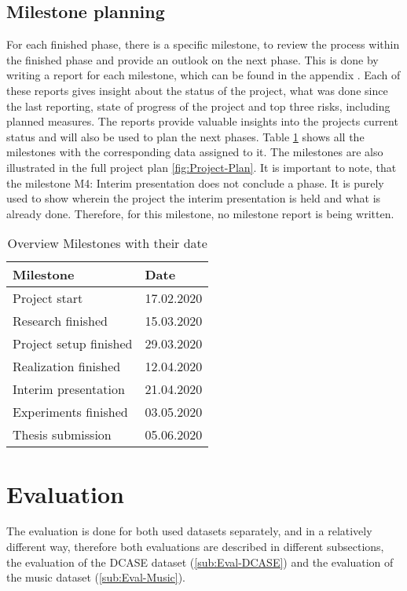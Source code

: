 \subsection{Milestone planning}
\label{sec:Milestone-Planning}
For each finished phase, there is a specific milestone, to review the process within the finished phase and provide an outlook on the next phase. This is done by writing a report for each milestone, which can be found in the appendix . Each of these reports gives insight about the status of the project, what was done since the last reporting, state of progress of the project and top three risks, including planned measures. The reports provide valuable insights into the projects current status and will also be used to plan the next phases. Table \ref{tab:Milestones} shows all the milestones with the corresponding data assigned to it. The milestones are also illustrated in the full project plan \ref{fig:Project-Plan}.
\newline
\newline
It is important to note, that the milestone M4: Interim presentation does not conclude a phase. It is purely used to show wherein the project the interim presentation is held and what is already done. Therefore, for this milestone, no milestone report is being written.

\begin{table}[htbp]
    \centering
    \caption{Overview Milestones with their date}
	\label{tab:Milestones}
    \begin{tabular}{p{} | p{}}
        \toprule
        \textbf{Milestone} & \textbf{Date} \\ 
        \midrule[1pt]
        Project start & 17.02.2020\\
        \hline
        Research finished & 15.03.2020\\
        \hline
        Project setup finished & 29.03.2020\\
        \hline
        Realization finished & 12.04.2020\\
        \hline
        Interim presentation & 21.04.2020\\
        \hline
        Experiments finished & 03.05.2020\\
        \hline
        Thesis submission & 05.06.2020\\
        \bottomrule
    \end{tabular}
\end{table}

\section{Evaluation}
\label{sec:Evaluation}
The evaluation is done for both used datasets separately, and in a relatively different way, therefore both evaluations are described in different subsections, the evaluation of the DCASE dataset (\ref{sub:Eval-DCASE}) and the evaluation of the music dataset (\ref{sub:Eval-Music}).

